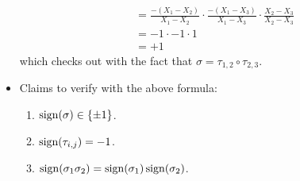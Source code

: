 \documentclass[../notes.tex]{subfiles}
\begin{document}
\begin{itemize}
\begin{align*}
        &= \frac{-(X_1-X_2)}{X_1-X_2}\cdot\frac{-(X_1-X_3)}{X_1-X_3}\cdot\frac{X_2-X_3}{X_2-X_3}\\
        &= -1\cdot -1\cdot 1\\
        &= +1
    \end{align*}
    which checks out with the fact that $\sigma=\tau_{1,2}\circ\tau_{2,3}$.
    \item Claims to verify with the above formula:
    \begin{enumerate}
        \item $\operatorname{sign}(\sigma)\in\{\pm 1\}$.
        \item $\operatorname{sign}(\tau_{i,j})=-1$.
        \item $\operatorname{sign}(\sigma_1\sigma_2)=\operatorname{sign}(\sigma_1)\operatorname{sign}(\sigma_2)$.
    \end{enumerate}
\end{itemize}
\end{document}
